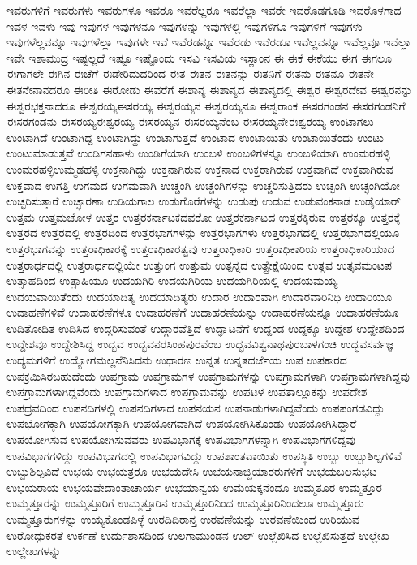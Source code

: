 {ಇವರುಗಳಿಗೆ
ಇವರುಗಳು
ಇವರುಗಳೂ
ಇವರೂ
ಇವರೆಲ್ಲರೂ
ಇವರೆಲ್ಲಾ
ಇವರೇ
ಇವರೊಡಗೂಡಿ
ಇವರೊಳಗಾದ
ಇವಳ
ಇವಳು
ಇವು
ಇವುಗಳ
ಇವುಗಳನೂ
ಇವುಗಳನ್ನು
ಇವುಗಳಲ್ಲಿ
ಇವುಗಳಿಗೂ
ಇವುಗಳಿಗೆ
ಇವುಗಳು
ಇವುಗಳೆಲ್ಲವನ್ನೂ
ಇವುಗಳೆಲ್ಲಾ
ಇವುಗಳೇ
ಇವೆ
ಇವೆರಡನ್ನೂ
ಇವೆರಡು
ಇವೆರಡೂ
ಇವೆಲ್ಲವನ್ನೂ
ಇವೆಲ್ಲವೂ
ಇವೆಲ್ಲಾ
ಇವೇ
ಇಶಾಮುದ್ರ
ಇಷ್ಟಲ್ಲದೆ
ಇಷ್ಟೂ
ಇಷ್ಟೊಂದು
ಇಸವಿ
ಇಸವಿಯ
ಇಸ್ಲಾಂನ
ಈ
ಈಕೆ
ಈಕೆಯು
ಈಗ
ಈಗಲೂ
ಈಗಾಗಲೇ
ಈಗಿನ
ಈಚೆಗೆ
ಈಡೇರಿದುದರಿಂದ
ಈತ
ಈತನ
ಈತನನ್ನು
ಈತನಿಗೆ
ಈತನು
ಈತನೂ
ಈತನೇ
ಈತನೇನಾನದರೂ
ಈರೀತಿ
ಈರೋಡು
ಈವರೆಗೆ
ಈಶಾನ್ಯ
ಈಶಾನ್ಯದ
ಈಶಾನ್ಯದಲ್ಲಿ
ಈಶ್ವರ
ಈಶ್ವರದೇವ
ಈಶ್ವರನನ್ನು
ಈಶ್ವರಭಕ್ತನಾದರೂ
ಈಶ್ವರಯ್ಯಈಸರಯ್ಯ
ಈಶ್ವರಯ್ಯನ
ಈಶ್ವರಯ್ಯನೂ
ಈಶ್ವರಾಂಕ
ಈಸರಗಂಡನ
ಈಸರಗಂಡನಿಗೆ
ಈಸರಗಂಡನು
ಈಸರಯ್ಯಈಶ್ವರಯ್ಯ
ಈಸರಯ್ಯನ
ಈಸರಯ್ಯನೆಂಬ
ಈಸರಯ್ಯನೇಈಶ್ವರಯ್ಯ
ಉಂಟಾಗಲು
ಉಂಟಾಗಿದೆ
ಉಂಟಾಗಿದ್ದ
ಉಂಟಾಗಿದ್ದು
ಉಂಟಾಗುತ್ತದೆ
ಉಂಟಾದ
ಉಂಟಾಯಿತು
ಉಂಟಾಯಿತೆಂದು
ಉಂಟು
ಉಂಟುಮಾಡುತ್ತವೆ
ಉಂಡಿಗನಹಾಳು
ಉಂಡಿಗೆಯಾಗಿ
ಉಂಬಳಿ
ಉಂಬಳಿಗಳನ್ನೂ
ಉಂಬಳಿಯಾಗಿ
ಉಂಮರಹಳ್ಳಿ
ಉಂಮರಹಳ್ಳಿಉಮ್ಮಡಹಳ್ಳಿ
ಉಕ್ತನಾಗಿದ್ದು
ಉಕ್ತನಾಗಿರುವ
ಉಕ್ತನಾದ
ಉಕ್ತರಾಗಿರುವ
ಉಕ್ತವಾಗಿದೆ
ಉಕ್ತವಾಗಿರುವ
ಉಕ್ತವಾದ
ಉಗತ್ತಿ
ಉಗಮದ
ಉಗಮವಾಗಿ
ಉಚ್ಚಂಗಿ
ಉಚ್ಚಂಗಿಗಳನ್ನು
ಉಚ್ಚರಿಸುತ್ತಿದರು
ಉಚ್ಛಂಗಿ
ಉಚ್ಛಂಗಿಯೋ
ಉಚ್ಛರಿಸುತ್ತಾರೆ
ಉಚ್ಛಾರಣಾ
ಉಡಿಯಗಾಲ
ಉಡುಗೊರೆಗಳನ್ನು
ಉಡುಪು
ಉಡುವ
ಉಡುವಂಕನಾಡ
ಉಡೈಯಾರ್
ಉತ್ತಮ
ಉತ್ತಮಚೋಳ
ಉತ್ತರ
ಉತ್ತರಕರ್ನಾಟಕದವರೋ
ಉತ್ತರಕರ್ನಾಟದ
ಉತ್ತರಕ್ಕಿರುವ
ಉತ್ತರಕ್ಕೂ
ಉತ್ತರಕ್ಕೆ
ಉತ್ತರದ
ಉತ್ತರದಲ್ಲಿ
ಉತ್ತರದಿಂದ
ಉತ್ತರಭಾಗಗಳನ್ನು
ಉತ್ತರಭಾಗಗಳು
ಉತ್ತರಭಾಗದಲ್ಲಿ
ಉತ್ತರಭಾಗದಲ್ಲಿಯೂ
ಉತ್ತರಭಾಗವನ್ನು
ಉತ್ತರಾಧಿಕಾರಕ್ಕೆ
ಉತ್ತರಾಧಿಕಾರತ್ವವು
ಉತ್ತರಾಧಿಕಾರಿ
ಉತ್ತರಾಧಿಕಾರಿಯ
ಉತ್ತರಾಧಿಕಾರಿಯಾದ
ಉತ್ತರಾರ್ಧದಲ್ಲಿ
ಉತ್ತರಾರ್ಧದಲ್ಲಿಯೇ
ಉತ್ತುಂಗ
ಉತ್ತುಮ
ಉತ್ಪನ್ನದ
ಉತ್ಪ್ರೇಕ್ಷೆಯಿಂದ
ಉತ್ಸವ
ಉತ್ಸವಮಂಟಪ
ಉತ್ಸಾಹದಿಂದ
ಉತ್ಸಾಹಿಯೂ
ಉದಯಗಿರಿ
ಉದಯಗಿರಿಯ
ಉದಯಗಿರಿಯಲ್ಲಿ
ಉದಯಮಯ್ಯ
ಉದಯವಾಯಿತೆಂದು
ಉದಯಾದಿತ್ಯ
ಉದಯಾದಿತ್ಯರು
ಉದಾರ
ಉದಾರವಾಗಿ
ಉದಾರವಾರಿನಿಧಿ
ಉದಾರಿಯೂ
ಉದಾಹಣೆಗಳಿವೆ
ಉದಾಹರಣೆಗಳೂ
ಉದಾಹರಣೆಗೆ
ಉದಾಹರಣೆಯನ್ನು
ಉದಾಹರಣೆಯನ್ನೂ
ಉದಾಹರಣೆಯೂ
ಉದಿತೋದಿತ
ಉದಿಸಿದ
ಉದ್ಗರಿಸುವಂತೆ
ಉದ್ಗಾರವೆತ್ತಿದೆ
ಉದ್ಘಾಟನೆಗೆ
ಉದ್ದಂಡ
ಉದ್ದಕ್ಕೂ
ಉದ್ದೇಶ
ಉದ್ದೇಶದಿಂದ
ಉದ್ದೇಶವೂ
ಉದ್ದೇಶಿಸಿದ್ದ
ಉದ್ಭವ
ಉದ್ಭವನರಸಿಂಹಪುರವೆಂಬ
ಉದ್ಭವವಿಶ್ವನಾಥಪುರಬಾಳಗಂಚಿ
ಉದ್ಭವಸರ್ವಜ್ಞ
ಉದ್ಯಮಗಳಿಗೆ
ಉದ್ಯೋಗಮಲ್ಲನೆನಿಸಿದನು
ಉಧಾರಣ
ಉನ್ನತ
ಉನ್ನತದರ್ಜೆಯ
ಉಪ
ಉಪಕಾರದ
ಉಪಕ್ರಮಿಸಿರಬಹುದೆಂದು
ಉಪಗ್ರಾಮ
ಉಪಗ್ರಾಮಗಳ
ಉಪಗ್ರಾಮಗಳನ್ನು
ಉಪಗ್ರಾಮಗಳಾಗಿ
ಉಪಗ್ರಾಮಗಳಾಗಿದ್ದವು
ಉಪಗ್ರಾಮಗಳಾಗಿದ್ದವೆಂದು
ಉಪಗ್ರಾಮಗಳಾದ
ಉಪಗ್ರಾಮವನ್ನು
ಉಪಟಳ
ಉಪತಾಲ್ಲೂಕನ್ನು
ಉಪದೇಶ
ಉಪದ್ರವದಿಂದ
ಉಪನದಿಗಳಲ್ಲಿ
ಉಪನದಿಗಳಾದ
ಉಪನಯನ
ಉಪನಾಡುಗಳಾಗಿದ್ದವೆಂದು
ಉಪಪಂಗಡವಿದ್ದು
ಉಪಭೋಗಕ್ಕಾಗಿ
ಉಪಯೋಗಕ್ಕಾಗಿ
ಉಪಯೋಗವಾಗಿದೆ
ಉಪಯೋಗಿಸಿಕೊಂಡು
ಉಪಯೋಗಿಸಿದ್ದಾರೆ
ಉಪಯೋಗಿಸುವ
ಉಪಯೋಗಿಸುವವರು
ಉಪವಿಭಾಗಕ್ಕೆ
ಉಪವಿಭಾಗಗಳನ್ನಾಗಿ
ಉಪವಿಭಾಗಗಳಿದ್ದವು
ಉಪವಿಭಾಗಗಳಿದ್ದು
ಉಪವಿಭಾಗದಲ್ಲಿ
ಉಪವಿಭಾಗವಿದ್ದು
ಉಪಶಾಂತವಾಯಿತು
ಉಪಸ್ಥಿತಿ
ಉಬ್ಬು
ಉಬ್ಬುಶಿಲ್ಪಗಳಿವೆ
ಉಬ್ಬುಶಿಲ್ಪವಿದೆ
ಉಭಯ
ಉಭಯತ್ರರೂ
ಉಭಯದೇಸಿ
ಉಭಯನಾಚ್ಚಿಯಾರರುಗಳಿಗೆ
ಉಭಯಬಲಸುಭಟ
ಉಭಯರಾಯ
ಉಭಯವೇದಾಂತಾಚಾರ್ಯ
ಉಭಯಾನ್ವಯ
ಉಮೆಯಕ್ಕನೆಂದೂ
ಉಮ್ಮತೂರ
ಉಮ್ಮತ್ತೂರ
ಉಮ್ಮತ್ತೂರನ್ನು
ಉಮ್ಮತ್ತೂರಿಗೆ
ಉಮ್ಮತ್ತೂರಿನ
ಉಮ್ಮತ್ತೂರಿನಿಂದ
ಉಮ್ಮತ್ತೂರಿನಿಂದಲೂ
ಉಮ್ಮತ್ತೂರು
ಉಮ್ಮತ್ತೂರುಗಳನ್ನು
ಉಯ್ಯಕೊಂಡಪಿಳ್ಳೆ
ಉರದಿದಿರಾನ್ತ
ಉರವಣೆಯನ್ನು
ಉರವಣೆಯಿಂದ
ಉರಿಯುವ
ಉರೋದ್ಗುಕರತೆ
ಉರ್ಕಣೆ
ಉರ್ದುಶಾಸದಿಂದ
ಉಲಗಾಮುಂಡನ
ಉಲ್
ಉಲ್ಲೆಖಿಸಿದ
ಉಲ್ಲೆಖಿಸುತ್ತದೆ
ಉಲ್ಲೇಖ
ಉಲ್ಲೇಖಗಳನ್ನು
}
